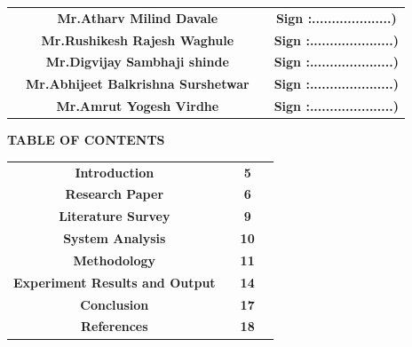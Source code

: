 \documentclass[12pt]{article}
\begin{document}
   
 \begin{tabular}{ c c c c } 
  \hspace{0.4in}&\textbf{Mr.Atharv Milind Davale} & \hspace{0.5in}  & \textbf{ Sign :....................)} \\ [1mm] 
  \hspace{0.4in} &\textbf {Mr.Rushikesh Rajesh Waghule}& \hspace{0.5in}   & \textbf{Sign :.....................) }\\[1mm]
  \hspace{0.4in}  &\textbf{ Mr.Digvijay Sambhaji shinde } & \hspace{0.5in}  & \textbf{Sign :.....................) }\\[1mm]
  \hspace{0.4in}  &\textbf{ Mr.Abhijeet Balkrishna Surshetwar} & \hspace{0.5in}  & \textbf{Sign :.....................) }\\[1mm]
  \hspace{0.4in}  &\textbf{ Mr.Amrut Yogesh Virdhe } & \hspace{0.5in}  & \textbf{Sign :.....................) }\\[7mm]
 \end{tabular}   


\clearpage


\begin{center}
 \Large \textbf {TABLE OF CONTENTS }\\[15mm]
 \end{center}


\begin{tabular}{ c c c c } 
  
\textbf{Introduction} & \hspace{2.5in}  & \textbf{5} \\ [5mm] 
\textbf{Research Paper} & \hspace{2.5in}  & \textbf{6} \\ [5mm] 
  \textbf{Literature Survey} & \hspace{2.5in}  & \textbf{9} \\ [5mm]
  \textbf{System Analysis} & \hspace{2.5in}  & \textbf{10} \\ [5mm] 
  \textbf{Methodology} & \hspace{2.5in}  & \textbf{11} \\ [5mm] 
  \textbf{Experiment Results and Output} & \hspace{2.5in}  & \textbf{14} \\ [5mm] 
  \textbf{Conclusion} & \hspace{2.5in}  & \textbf{17} \\ [5mm] 
  \textbf{References} & \hspace{2.5in}  & \textbf{18} \\ [5mm]  
 \end{tabular}  
\end{document}
